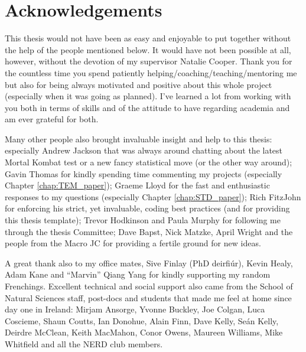 \chapter*{Acknowledgements}

This thesis would not have been as easy and enjoyable to put together without the help of the people mentioned below.
It would have not been possible at all, however, without the devotion of my supervisor Natalie Cooper.
Thank you for the countless time you spend patiently helping/coaching/teaching/mentoring me but also for being always motivated and positive about this whole project (especially when it was going as planned).
I've learned a lot from working with you both in terms of skills and of the attitude to have regarding academia and am ever grateful for both.

Many other people also brought invaluable insight and help to this thesis:
especially Andrew Jackson that was always around chatting about the latest Mortal Kombat test or a new fancy statistical move (or the other way around);
Gavin Thomas for kindly spending time commenting my projects (especially Chapter \ref{chap:TEM_paper});
Graeme Lloyd for the fast and enthusiastic responses to my questions (especially Chapter \ref{chap:STD_paper});
Rich FitzJohn for enforcing his strict, yet invaluable, coding best practices (and for providing this thesis template);
Trevor Hodkinson and Paula Murphy for following me through the thesis Committee;
Dave Bapst, Nick Matzke, April Wright and the people from the Macro JC for providing a fertile ground for new ideas.

A great thank also to my office mates, Sive Finlay (PhD deirfi\'{u}r), Kevin Healy, Adam Kane and ``Marvin'' Qiang Yang for kindly supporting my random Frenchings.
Excellent technical and social support also came from the School of Natural Sciences staff, post-docs and students that made me feel at home since day one in Ireland:
Mirjam Ansorge, Yvonne Buckley, Joe Colgan, Luca Coscieme, Shaun Coutts, Ian Donohue, Alain Finn, Dave Kelly, Se\'{a}n Kelly, Deirdre McClean, Keith MacMahon, Conor Owens, Maureen Williams, Mike Whitfield and all the NERD club members.

